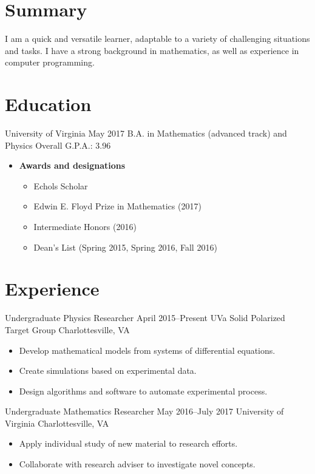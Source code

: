 \documentclass[12pt]{article}
\begin{document}


\section*{Summary}
I am a quick and versatile learner, adaptable to a variety of challenging situations and tasks.
I have a strong background in mathematics, as well as experience in computer programming.

\section*{Education}
\entry
    {University of Virginia}
    {May 2017}
    {B.A. in Mathematics (advanced track) and Physics}
    {Overall G.P.A.: 3.96}
\begin{itemize}
    \item \textbf{Awards and designations}
        \begin{itemize}
            \item Echols Scholar
            \item Edwin E. Floyd Prize in Mathematics (2017)
            \item Intermediate Honors (2016)
            \item Dean's List (Spring 2015, Spring 2016, Fall 2016)
        \end{itemize}
\end{itemize}

\section*{Experience}
\entry
    {Undergraduate Physics Researcher}
    {April 2015--Present}
    {UVa Solid Polarized Target Group}
    {Charlottesville, VA}
\begin{itemize}
    \item Develop mathematical models from systems of differential equations.
    \item Create simulations based on experimental data.
    \item Design algorithms and software to automate experimental process.
\end{itemize}

\entry
    {Undergraduate Mathematics Researcher}
    {May 2016--July 2017}
    {University of Virginia}
    {Charlottesville, VA}
\begin{itemize}
    \item Apply individual study of new material to research efforts.
    \item Collaborate with research adviser to investigate novel concepts.
\end{itemize}
\end{document}
